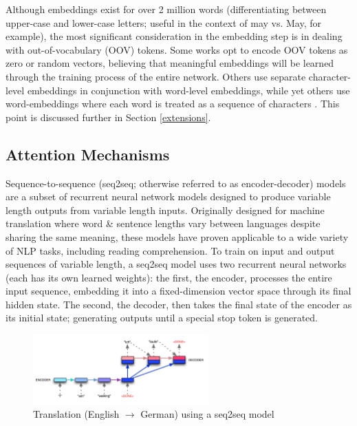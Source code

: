 \documentclass{article}
\begin{document}
Although embeddings exist for over 2 million words (differentiating between upper-case and lower-case letters; useful in the context of may vs. May, for example), the most significant consideration in the embedding step is in dealing with out-of-vocabulary (OOV) tokens. Some works opt to encode OOV tokens as zero or random vectors, believing that meaningful embeddings will be learned through the training process of the entire network. Others use separate character-level embeddings in conjunction with word-level embeddings, while yet others use word-embeddings where each word is treated as a sequence of characters \cite{ELMo}. This point is discussed further in Section \ref{extensions}.

\subsection{Attention Mechanisms}
Sequence-to-sequence (seq2seq; otherwise referred to as encoder-decoder) models are a subset of recurrent neural network models designed to produce variable length outputs from variable length inputs. Originally designed for machine translation \cite{seq2seq} where word \& sentence lengths vary between languages despite sharing the same meaning, these models have proven applicable to a wide variety of NLP tasks, including reading comprehension. To train on input and output sequences of variable length, a seq2seq model uses two recurrent neural networks (each has its own learned weights): the first, the encoder, processes the entire input sequence, embedding it into a fixed-dimension vector space through its final hidden state. The second, the decoder, then takes the final state of the encoder as its initial state; generating outputs until a special stop token is generated. 

\begin{figure}[h]
	\includegraphics[width=0.6\textwidth]{seq2seq.png}
	\centering
	\caption{Translation (English $\rightarrow$ German) using a seq2seq model}
	\label{fig:seq2seq}
\end{figure}
\end{document}
